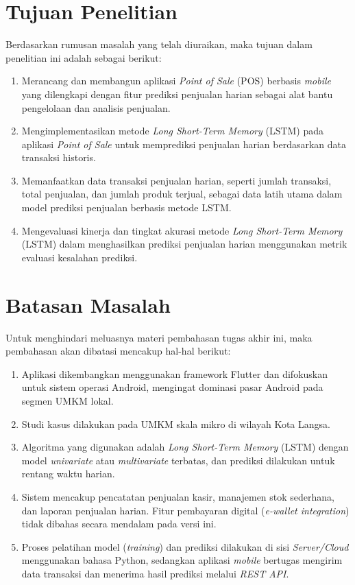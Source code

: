 \section{Tujuan Penelitian}
Berdasarkan rumusan masalah yang telah diuraikan, maka tujuan dalam penelitian ini adalah sebagai berikut:
\begin{enumerate}
    \item Merancang dan membangun aplikasi \textit{Point of Sale} (POS) berbasis \textit{mobile} yang dilengkapi dengan fitur prediksi penjualan harian sebagai alat bantu pengelolaan dan analisis penjualan.
    \item Mengimplementasikan metode \textit{Long Short-Term Memory} (LSTM) pada aplikasi \textit{Point of Sale} untuk memprediksi penjualan harian berdasarkan data transaksi historis.
    \item Memanfaatkan data transaksi penjualan harian, seperti jumlah transaksi, total penjualan, dan jumlah produk terjual, sebagai data latih utama dalam model prediksi penjualan berbasis metode LSTM.
    \item Mengevaluasi kinerja dan tingkat akurasi metode \textit{Long Short-Term Memory} (LSTM) dalam menghasilkan prediksi penjualan harian menggunakan metrik evaluasi kesalahan prediksi.
\end{enumerate}

\section{Batasan Masalah}
Untuk menghindari meluasnya materi pembahasan tugas akhir ini, maka pembahasan akan dibatasi mencakup hal-hal berikut:
\begin{enumerate}
    \item Aplikasi dikembangkan menggunakan framework Flutter dan difokuskan untuk sistem operasi Android, mengingat dominasi pasar Android pada segmen UMKM lokal.
    \item Studi kasus dilakukan pada UMKM skala mikro di wilayah Kota Langsa.
    \item Algoritma yang digunakan adalah \textit{Long Short-Term Memory} (LSTM) dengan model \textit{univariate} atau \textit{multivariate} terbatas, dan prediksi dilakukan untuk rentang waktu harian.
    \item Sistem mencakup pencatatan penjualan kasir, manajemen stok sederhana, dan laporan penjualan harian. Fitur pembayaran digital (\textit{e-wallet integration}) tidak dibahas secara mendalam pada versi ini.
    \item Proses pelatihan model (\textit{training}) dan prediksi dilakukan di sisi \textit{Server/Cloud} menggunakan bahasa Python, sedangkan aplikasi \textit{mobile} bertugas mengirim data transaksi dan menerima hasil prediksi melalui \textit{REST API}.
\end{enumerate}

